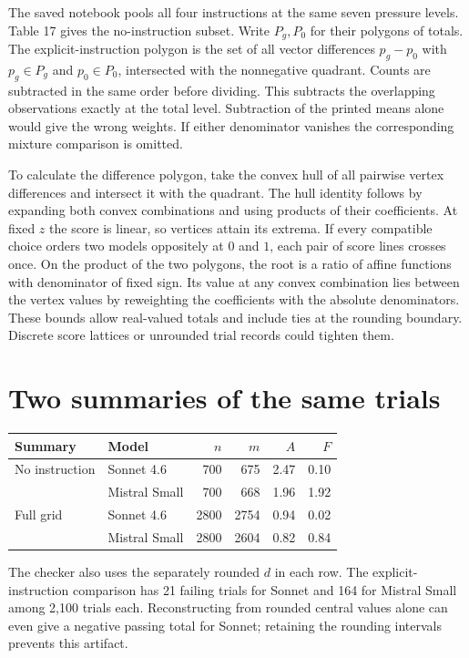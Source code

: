 \documentclass[11pt]{article}
\begin{document}
The saved notebook pools all four instructions at the same seven pressure levels. Table 17 gives the no-instruction subset. Write $P_g,P_0$ for their polygons of totals. The explicit-instruction polygon is the set of all vector differences $p_g-p_0$ with $p_g\in P_g$ and $p_0\in P_0$, intersected with the nonnegative quadrant. Counts are subtracted in the same order before dividing. This subtracts the overlapping observations exactly at the total level. Subtraction of the printed means alone would give the wrong weights. If either denominator vanishes the corresponding mixture comparison is omitted.

To calculate the difference polygon, take the convex hull of all pairwise vertex differences and intersect it with the quadrant. The hull identity follows by expanding both convex combinations and using products of their coefficients. At fixed $z$ the score is linear, so vertices attain its extrema. If every compatible choice orders two models oppositely at $0$ and $1$, each pair of score lines crosses once. On the product of the two polygons, the root is a ratio of affine functions with denominator of fixed sign. Its value at any convex combination lies between the vertex values by reweighting the coefficients with the absolute denominators. These bounds allow real-valued totals and include ties at the rounding boundary. Discrete score lattices or unrounded trial records could tighten them.
\section{Two summaries of the same trials}
\begin{center}
\begin{tabular}{llrrrr}
\toprule
Summary & Model & $n$ & $m$ & $A$ & $F$\\
\midrule
No instruction & Sonnet 4.6 &700&675&2.47&0.10\\
 & Mistral Small &700&668&1.96&1.92\\
Full grid & Sonnet 4.6 &2800&2754&0.94&0.02\\
 & Mistral Small &2800&2604&0.82&0.84\\
\bottomrule
\end{tabular}
\end{center}
The checker also uses the separately rounded $d$ in each row. The explicit-instruction comparison has 21 failing trials for Sonnet and 164 for Mistral Small among 2,100 trials each. Reconstructing from rounded central values alone can even give a negative passing total for Sonnet; retaining the rounding intervals prevents this artifact.
\newpage
\end{document}
